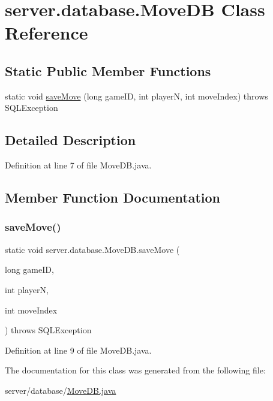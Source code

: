 \hypertarget{classserver_1_1database_1_1_move_d_b}{}\section{server.\+database.\+Move\+DB Class Reference}
\label{classserver_1_1database_1_1_move_d_b}
\subsection*{Static Public Member Functions}
\begin{DoxyCompactItemize}
\item 
static void \hyperlink{classserver_1_1database_1_1_move_d_b_a597be5165e8ed9fc94a9d8643931e3d7}{save\+Move} (long game\+ID, int playerN, int move\+Index)  throws S\+Q\+L\+Exception 
\end{DoxyCompactItemize}


\subsection{Detailed Description}


Definition at line 7 of file Move\+D\+B.\+java.



\subsection{Member Function Documentation}
\hypertarget{classserver_1_1database_1_1_move_d_b_a597be5165e8ed9fc94a9d8643931e3d7}{}\label{classserver_1_1database_1_1_move_d_b_a597be5165e8ed9fc94a9d8643931e3d7} 
\subsubsection{\texorpdfstring{save\+Move()}{saveMove()}}
{\footnotesize\ttfamily static void server.\+database.\+Move\+D\+B.\+save\+Move (\begin{DoxyParamCaption}\item[{long}]{game\+ID,  }\item[{int}]{playerN,  }\item[{int}]{move\+Index }\end{DoxyParamCaption}) throws S\+Q\+L\+Exception\hspace{0.3cm}{\ttfamily [static]}}



Definition at line 9 of file Move\+D\+B.\+java.



The documentation for this class was generated from the following file\+:\begin{DoxyCompactItemize}
\item 
server/database/\hyperlink{_move_d_b_8java}{Move\+D\+B.\+java}\end{DoxyCompactItemize}
